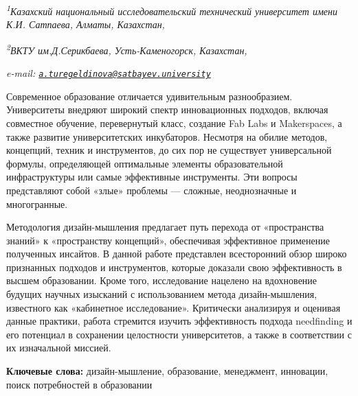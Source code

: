 \begin{affiliation}
\emph{\textsuperscript{1}Казахский национальный исследовательский технический университет имени К.И. Сатпаева, Алматы, Казахстан,}

\emph{\textsuperscript{2}ВКТУ им.Д.Серикбаева, Усть-Каменогорск, Казахстан,}

\emph{e-mail: \href{mailto:a.turegeldinova@satbayev.university}{\nolinkurl{a.turegeldinova@satbayev.university}}}
\end{affiliation}

Современное образование отличается удивительным разнообразием.
Университеты внедряют широкий спектр инновационных подходов, включая
совместное обучение, перевернутый класс, создание Fab Labs и
Makerspaces, а также развитие университетских инкубаторов. Несмотря на
обилие методов, концепций, техник и инструментов, до сих пор не
существует универсальной формулы, определяющей оптимальные элементы
образовательной инфраструктуры или самые эффективные инструменты. Эти
вопросы представляют собой «злые» проблемы --- сложные, неоднозначные и
многогранные.

Методология дизайн-мышления предлагает путь перехода от «пространства
знаний» к «пространству концепций», обеспечивая эффективное применение
полученных инсайтов. В данной работе представлен всесторонний обзор
широко признанных подходов и инструментов, которые доказали свою
эффективность в высшем образовании. Кроме того, исследование нацелено на
вдохновение будущих научных изысканий с использованием метода
дизайн-мышления, известного как «кабинетное исследование». Критически
анализируя и оценивая данные практики, работа стремится изучить
эффективность подхода needfinding и его потенциал в сохранении
целостности университетов, а также в соответствии с их изначальной
миссией.

{\bfseries Ключевые слова:} дизайн-мышление, образование, менеджмент,
инновации, поиск потребностей в образовании

